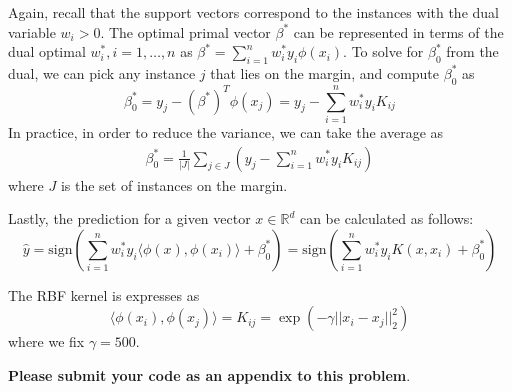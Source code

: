 \documentclass{article}
\theoremstyle{remark}
\theoremstyle{definition}
\def\R{\mathbb{R}}
\def\sign{\mathrm{sign}}
\begin{document}
Again, recall that the support vectors correspond to the instances with the dual
variable $w_i > 0$.
The optimal primal vector
$\beta^*$ can be represented in terms of the dual optimal $w^*_i, i=1,\ldots, n$ as
$\beta^* = \sum_{i=1}^n w^*_iy_i\phi(x_i)$.
To solve for $\beta^*_0$ from the
dual, we can pick any instance $j$ that lies on the margin, and compute
$\beta^*_0$ as 
$$\beta^*_0 = y_j - (\beta^*)^T\phi(x_j) = y_j - \sum_{i=1}^n w_i^* y_iK_{ij}$$
In practice, in order to reduce the variance, we can take the average as
\begin{align}
\beta^*_0 = \frac{1}{|J|}\sum_{j\in J}\left(y_j - \sum_{i=1}^n w_i^* y_iK_{ij}\right)
\label{eq:kernel_svm_intercept}
\end{align}
where $J$ is the set of instances on the margin.

Lastly, the prediction for a given vector $x\in\R^d$ can be
calculated as follows:
\begin{equation}
  \hat{y} = \sign\left(\sum_{i=1}^n w^*_i y_i \langle \phi(x), \phi(x_i)\rangle + \beta^*_0\right) = \sign\left(\sum_{i=1}^n w^*_i y_i K(x, x_i) + \beta^*_0\right)
  \label{eq:kernel_svm_prediction}
\end{equation}

The RBF kernel is expresses as
$$\langle \phi(x_i), \phi(x_j) \rangle = K_{ij} = \exp\left(-\gamma||x_i - x_j||_2^2\right)$$
where we fix $\gamma = 500$.

\textbf{Please submit your code as an appendix to this problem}.
\end{document}
